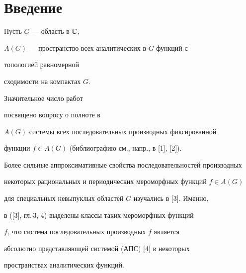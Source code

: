 \date{}




\pagestyle{plain} %







\maketitle


\label{begin}








\section*{Введение}





Пусть $G$ --- область в $\Bbb C$,


$A(G)$ --- пространство всех аналитических в $G$ функций с


топологией равномерной


сходимости на компактах $G$.


Значительное число работ




посвящено вопросу о полноте в


$A(G)$ системы всех последовательных производных фиксированной


функции $f\in A(G)$ (библиографию см., напр., в [1], [2]).


Более сильные аппроксимативные свойства последовательностей производных


некоторых рациональных и периодических мероморфных функций $f\in A(G)$ 


для специальных невыпуклых областей $G$ изучались в [3]. Именно,


в ([3], гл.\,3, 4) выделены классы таких мероморфных функций


$f$, что система последовательных производных $f$ является


абсолютно представляющей системой (АПС) [4] в некоторых


пространствах аналитических функций.





